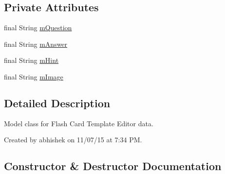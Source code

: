 \subsection*{Private Attributes}
\begin{DoxyCompactItemize}
\item 
final String \hyperlink{classorg_1_1buildmlearn_1_1toolkit_1_1templates_1_1FlashCardModel_a0c75cd9e4ab66ec72e7f7188f55012a5}{m\+Question}
\item 
final String \hyperlink{classorg_1_1buildmlearn_1_1toolkit_1_1templates_1_1FlashCardModel_a690bc949937e43f6e64c5c4ef6fe3636}{m\+Answer}
\item 
final String \hyperlink{classorg_1_1buildmlearn_1_1toolkit_1_1templates_1_1FlashCardModel_aec683e14e90b882f895d769f9809dda4}{m\+Hint}
\item 
final String \hyperlink{classorg_1_1buildmlearn_1_1toolkit_1_1templates_1_1FlashCardModel_a3df0201957fbfedf079fcf2cbda83e87}{m\+Image}
\end{DoxyCompactItemize}


\subsection{Detailed Description}
Model class for Flash Card Template Editor data. 

Created by abhishek on 11/07/15 at 7\+:34 PM. 

\subsection{Constructor \& Destructor Documentation}
